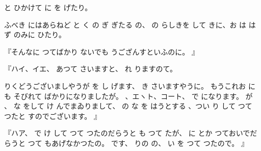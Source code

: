 と
ひかけて
に
を
げたり。

ふべき
にはあらねど
と
く
の
ぎ
ぎたる
の、
の
らしきを
して
きに、お
は
はず
のみに
ひたり。

『そんなに
つてばかり
ないでも
うござんすといふのに。
』

『ハイ、イエ、
あつて
さいますと、
れ
りますのて。

りくどうございましやうが
を
し
げます、
き
さいますやうに。
もうこれお
にも
そびれて
ばかりになりましたが。
、エヽト、コート、
で
になります。
が
、
な
をして
け
んでまゐりまして、
の
な
を
はうとする
、つい
り
して
つて
つたと
すのでございます。
』

『ハア、
で
け
して
つて
つたのだらうと
も
つて
たが、
に
とか
つておいでだらうと
つて
もあげなかつたの。
です、
りの
の、
い
を
つて
つたので。
』

